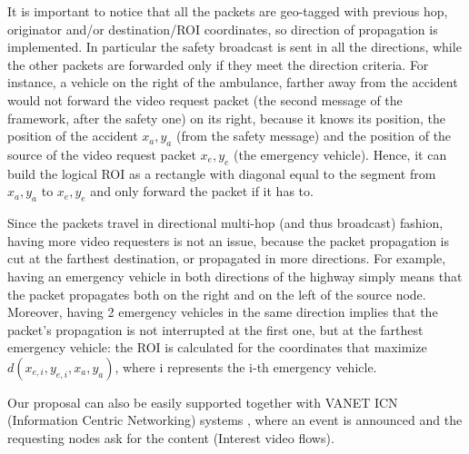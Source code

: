 \documentclass{sig-alternate-2013}
\begin{document}
It is important to notice that all the packets are geo-tagged with previous hop, originator and/or destination/ROI coordinates, so direction of propagation is implemented. In particular the safety broadcast is sent in all the directions, while the other packets are forwarded only if they meet the direction criteria. For instance, a vehicle on the right of the ambulance, farther away from the accident would not forward the video request packet (the second message of the framework, after the safety one) on its right, because it knows its position, the position of the accident $x_{a},y_{a}$ (from the safety message) and the position of the source of the video request packet $x_{e},y_{e}$ (the emergency vehicle). Hence, it can build the logical ROI as a rectangle with diagonal equal to the segment from $x_{a},y_{a}$ to $x_{e},y_{e}$ and only forward the packet if it has to.

Since the packets travel in directional multi-hop (and thus broadcast) fashion, having more video requesters is not an issue, because the packet propagation is cut at the farthest destination, or propagated in more directions. For example, having an emergency vehicle in both directions of the highway simply means that the packet propagates both on the right and on the left of the source node. Moreover, having 2 emergency vehicles in the same direction implies that the packet's propagation is not interrupted at the first one, but at the farthest emergency vehicle: the ROI is calculated for the coordinates that maximize $d(x_{e,i},y_{e,i},x_{a},y_{a})$, where i represents the i-th emergency vehicle.


Our proposal can also be easily supported together with VANET ICN (Information Centric Networking) systems \cite{QualityEstimator}, where an event is announced and the requesting nodes ask for the content (Interest video flows).
\end{document}
